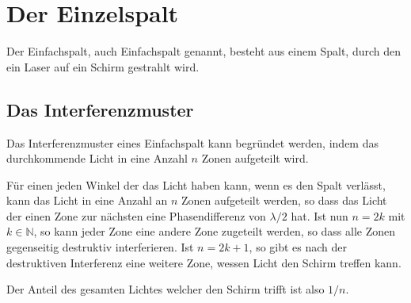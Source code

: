 \documentclass{article}
\begin{document}
\section{Der Einzelspalt} 
Der Einfachspalt, auch Einfachspalt genannt, besteht aus einem Spalt, durch den ein Laser auf ein Schirm gestrahlt wird.
 
\subsection{Das Interferenzmuster}
Das Interferenzmuster eines Einfachspalt kann begründet werden, indem das durchkommende Licht in eine Anzahl $n$ Zonen aufgeteilt wird.
 
Für einen jeden Winkel der das Licht haben kann, wenn es den Spalt verlässt, kann das Licht in eine Anzahl an $n$ Zonen aufgeteilt werden, so dass das Licht der einen Zone zur nächsten eine Phasendifferenz von $\lambda / 2$ hat. Ist nun $n = 2k$ mit $k \in \mathbb{N}$, so kann jeder Zone eine andere Zone zugeteilt werden, so dass alle Zonen gegenseitig destruktiv interferieren. Ist $n = 2k + 1$, so gibt es nach der destruktiven Interferenz eine weitere Zone, wessen Licht den Schirm treffen kann.
 
Der Anteil des gesamten Lichtes welcher den Schirm trifft ist also $1/n$. 
\end{document}
